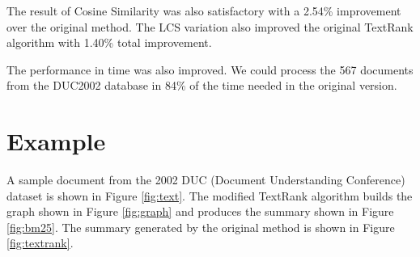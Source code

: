 \documentclass{llncs}
\begin{document}
The result of Cosine Similarity was also satisfactory with a 2.54\% improvement over the original method. The LCS variation also improved the original TextRank algorithm with 1.40\% total improvement.

The performance in time was also improved. We could process the 567 documents from the DUC2002 database in 84\% of the time needed in the original version.


\section{Example}
A sample document from the 2002 DUC (Document Understanding Conference) dataset \cite{duc2002-guidelines} is shown in Figure \ref{fig:text}. The modified TextRank algorithm builds the graph shown in Figure \ref{fig:graph} and produces the summary shown in Figure \ref{fig:bm25}. The summary generated by the original method is shown in Figure \ref{fig:textrank}.
\end{document}
